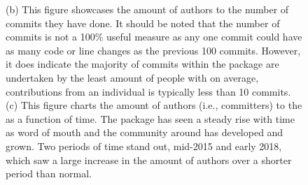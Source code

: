 \begin{figure}
{	(b) This figure showcases the amount of authors to the number of commits they have done.
	It should be noted that the number of commits is not a 100\% useful measure as any one commit could have as many code or line changes as the previous 100 commits.
	However, it does indicate the majority of commits within the package are undertaken by the least amount of people with on average, contributions from an individual is typically less than 10 commits.
	(c) This figure charts the amount of authors (i.e., committers) to the \sunpypkg as a function of time.
	The package has seen a steady rise with time as word of mouth and the community around \sunpy has developed and grown.
	Two periods of time stand out, mid-2015 and early 2018, which saw a large increase in the amount of authors over a shorter period than normal.
}
\label{fig:image2}
\end{figure}
